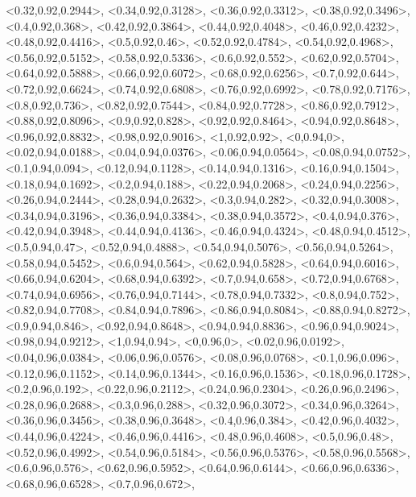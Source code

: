 \documentclass[a4paper,10pt]{article}
\begin{document}
\begin{eulernotebook}
\begin{euleroutput}
  <0.32,0.92,0.2944>,
  <0.34,0.92,0.3128>,
  <0.36,0.92,0.3312>,
  <0.38,0.92,0.3496>,
  <0.4,0.92,0.368>,
  <0.42,0.92,0.3864>,
  <0.44,0.92,0.4048>,
  <0.46,0.92,0.4232>,
  <0.48,0.92,0.4416>,
  <0.5,0.92,0.46>,
  <0.52,0.92,0.4784>,
  <0.54,0.92,0.4968>,
  <0.56,0.92,0.5152>,
  <0.58,0.92,0.5336>,
  <0.6,0.92,0.552>,
  <0.62,0.92,0.5704>,
  <0.64,0.92,0.5888>,
  <0.66,0.92,0.6072>,
  <0.68,0.92,0.6256>,
  <0.7,0.92,0.644>,
  <0.72,0.92,0.6624>,
  <0.74,0.92,0.6808>,
  <0.76,0.92,0.6992>,
  <0.78,0.92,0.7176>,
  <0.8,0.92,0.736>,
  <0.82,0.92,0.7544>,
  <0.84,0.92,0.7728>,
  <0.86,0.92,0.7912>,
  <0.88,0.92,0.8096>,
  <0.9,0.92,0.828>,
  <0.92,0.92,0.8464>,
  <0.94,0.92,0.8648>,
  <0.96,0.92,0.8832>,
  <0.98,0.92,0.9016>,
  <1,0.92,0.92>,
  <0,0.94,0>,
  <0.02,0.94,0.0188>,
  <0.04,0.94,0.0376>,
  <0.06,0.94,0.0564>,
  <0.08,0.94,0.0752>,
  <0.1,0.94,0.094>,
  <0.12,0.94,0.1128>,
  <0.14,0.94,0.1316>,
  <0.16,0.94,0.1504>,
  <0.18,0.94,0.1692>,
  <0.2,0.94,0.188>,
  <0.22,0.94,0.2068>,
  <0.24,0.94,0.2256>,
  <0.26,0.94,0.2444>,
  <0.28,0.94,0.2632>,
  <0.3,0.94,0.282>,
  <0.32,0.94,0.3008>,
  <0.34,0.94,0.3196>,
  <0.36,0.94,0.3384>,
  <0.38,0.94,0.3572>,
  <0.4,0.94,0.376>,
  <0.42,0.94,0.3948>,
  <0.44,0.94,0.4136>,
  <0.46,0.94,0.4324>,
  <0.48,0.94,0.4512>,
  <0.5,0.94,0.47>,
  <0.52,0.94,0.4888>,
  <0.54,0.94,0.5076>,
  <0.56,0.94,0.5264>,
  <0.58,0.94,0.5452>,
  <0.6,0.94,0.564>,
  <0.62,0.94,0.5828>,
  <0.64,0.94,0.6016>,
  <0.66,0.94,0.6204>,
  <0.68,0.94,0.6392>,
  <0.7,0.94,0.658>,
  <0.72,0.94,0.6768>,
  <0.74,0.94,0.6956>,
  <0.76,0.94,0.7144>,
  <0.78,0.94,0.7332>,
  <0.8,0.94,0.752>,
  <0.82,0.94,0.7708>,
  <0.84,0.94,0.7896>,
  <0.86,0.94,0.8084>,
  <0.88,0.94,0.8272>,
  <0.9,0.94,0.846>,
  <0.92,0.94,0.8648>,
  <0.94,0.94,0.8836>,
  <0.96,0.94,0.9024>,
  <0.98,0.94,0.9212>,
  <1,0.94,0.94>,
  <0,0.96,0>,
  <0.02,0.96,0.0192>,
  <0.04,0.96,0.0384>,
  <0.06,0.96,0.0576>,
  <0.08,0.96,0.0768>,
  <0.1,0.96,0.096>,
  <0.12,0.96,0.1152>,
  <0.14,0.96,0.1344>,
  <0.16,0.96,0.1536>,
  <0.18,0.96,0.1728>,
  <0.2,0.96,0.192>,
  <0.22,0.96,0.2112>,
  <0.24,0.96,0.2304>,
  <0.26,0.96,0.2496>,
  <0.28,0.96,0.2688>,
  <0.3,0.96,0.288>,
  <0.32,0.96,0.3072>,
  <0.34,0.96,0.3264>,
  <0.36,0.96,0.3456>,
  <0.38,0.96,0.3648>,
  <0.4,0.96,0.384>,
  <0.42,0.96,0.4032>,
  <0.44,0.96,0.4224>,
  <0.46,0.96,0.4416>,
  <0.48,0.96,0.4608>,
  <0.5,0.96,0.48>,
  <0.52,0.96,0.4992>,
  <0.54,0.96,0.5184>,
  <0.56,0.96,0.5376>,
  <0.58,0.96,0.5568>,
  <0.6,0.96,0.576>,
  <0.62,0.96,0.5952>,
  <0.64,0.96,0.6144>,
  <0.66,0.96,0.6336>,
  <0.68,0.96,0.6528>,
  <0.7,0.96,0.672>,

\end{euleroutput}
\end{eulernotebook}
\end{document}

